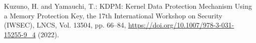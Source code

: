 \documentclass[11pt,a4paper]{article}
\begin{document}



\begin{thebibliography}{99}



  Kuzuno, H. and Yamauchi, T.: KDPM: Kernel Data Protection Mechanism Using a Memory Protection Key,
  the 17th International Workshop on Security (IWSEC), LNCS, Vol. 13504, pp. 66--84,
  \url{https://doi.org/10.1007/978-3-031-15255-9_4} (2022).

  
\end{thebibliography}
\end{document}

